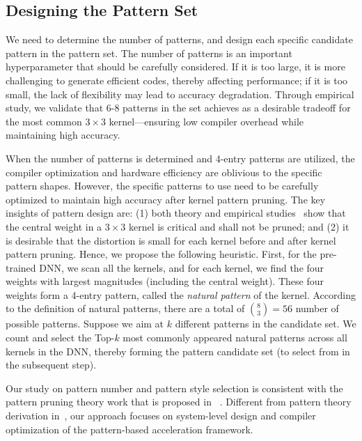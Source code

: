 \documentclass[sigplan,screen]{acmart}
\begin{document}
\subsection{Designing the Pattern Set}

We need to determine the number of patterns, and design each specific candidate pattern in the pattern set. The number of patterns is an important hyperparameter that should be carefully considered. 
If it is too large, it is more challenging to 
generate efficient codes, thereby affecting 
performance;
if it is too small, the lack of flexibility may lead to 
accuracy degradation. 
Through empirical study, we validate that 6-8 patterns in the set achieves as a desirable tradeoff for the most common $3\times 3$ kernel---ensuring low compiler overhead while maintaining high accuracy.



When the number of patterns is determined and 4-entry patterns are utilized, the compiler optimization
and hardware efficiency are oblivious to the 
specific pattern shapes. 
However, the specific patterns to use need to be 
carefully optimized to maintain high accuracy
after kernel pattern pruning. 
The key insights of pattern design are: 
(1) both theory and empirical studies~\cite{yamins2014performance,yamins2016using} show that the central weight in a $3\times 3$ kernel is critical and shall not be pruned; and 
(2) it is desirable that the distortion is small for each kernel before and after kernel pattern pruning. Hence, we propose the following heuristic. 
First, for the pre-trained DNN, we scan all the kernels, and for each kernel, we find the four weights with largest magnitudes (including the central weight). These four weights form a 4-entry pattern, called the \emph{natural pattern} of the kernel. According to the definition of natural patterns, there are a total of $\binom{8}{3}=56$ number of possible patterns.
Suppose we aim at $k$ different patterns in the candidate set. We count and select the Top-$k$ most commonly appeared natural patterns across all kernels in the DNN, thereby forming the pattern candidate set (to select from in the subsequent step).

Our study on pattern number and pattern style selection is consistent with the pattern pruning theory work that is proposed in ~\cite{ma2019pconv}. Different from pattern theory derivation in~\cite{ma2019pconv}, our approach focuses on system-level design and compiler optimization of the pattern-based acceleration framework. 
\end{document}

